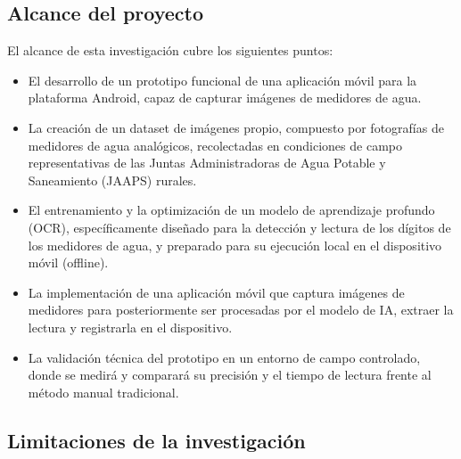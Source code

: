\subsection{Alcance del proyecto}
\label{subsec:project_scope}

El alcance de esta investigación cubre los siguientes puntos:
\begin{itemize}
\item El desarrollo de un prototipo funcional de una aplicación móvil para la plataforma Android, capaz de capturar imágenes de medidores de agua.
\item La creación de un dataset de imágenes propio, compuesto por fotografías de medidores de agua analógicos, recolectadas en condiciones de campo representativas de las Juntas Administradoras de Agua Potable y Saneamiento (JAAPS) rurales.
\item El entrenamiento y la optimización de un modelo de aprendizaje profundo (OCR), específicamente diseñado para la detección y lectura de los dígitos de los medidores de agua, y preparado para su ejecución local en el dispositivo móvil (offline).
\item La implementación de una aplicación móvil que captura imágenes de medidores para posteriormente ser procesadas por el modelo de IA, extraer la lectura y registrarla en el dispositivo.
\item La validación técnica del prototipo en un entorno de campo controlado, donde se medirá y comparará su precisión y el tiempo de lectura frente al método manual tradicional.
\end{itemize}

\subsection{Limitaciones de la investigación}
\label{subsec:research_limitations}

